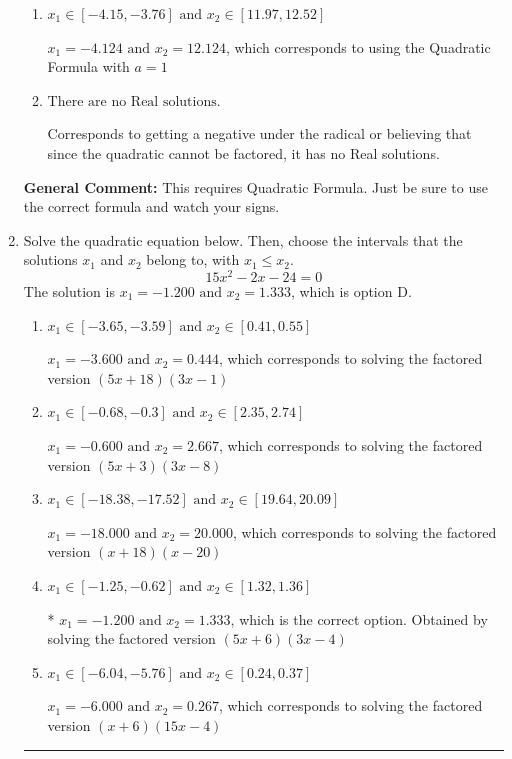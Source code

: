 \documentclass{extbook}[14pt]
\newcommand{\litem}[1]{\item #1

\rule{\textwidth}{0.4pt}}
\begin{document}
\begin{enumerate}
{\begin{enumerate}[label=\Alph*.]
 $x_1 = -15.848 \text{ and } x_2 = 16.648$, which corresponds to writing the Quadratic Formula as $-\frac{b}{2a} \pm \sqrt{b^2 - 4ac}$.
\item \( x_1 \in [-4.15, -3.76] \text{ and } x_2 \in [11.97, 12.52] \)

 $x_1 = -4.124 \text{ and } x_2 = 12.124$, which corresponds to using the Quadratic Formula with $a=1$
\item \( \text{There are no Real solutions.} \)

Corresponds to getting a negative under the radical or believing that since the quadratic cannot be factored, it has no Real solutions.
\end{enumerate}

\textbf{General Comment:} This requires Quadratic Formula. Just be sure to use the correct formula and watch your signs.
}
\litem{
Solve the quadratic equation below. Then, choose the intervals that the solutions $x_1$ and $x_2$ belong to, with $x_1 \leq x_2$.
\[ 15x^{2} -2 x -24 = 0 \]The solution is \( x_1 = -1.200 \text{ and } x_2 = 1.333 \), which is option D.\begin{enumerate}[label=\Alph*.]
\item \( x_1 \in [-3.65, -3.59] \text{ and } x_2 \in [0.41, 0.55] \)

$x_1 = -3.600 \text{ and } x_2 = 0.444$, which corresponds to solving the factored version $(5x + 18)(3x -1)$
\item \( x_1 \in [-0.68, -0.3] \text{ and } x_2 \in [2.35, 2.74] \)

$x_1 = -0.600 \text{ and } x_2 = 2.667$, which corresponds to solving the factored version $(5x + 3)(3x -8)$
\item \( x_1 \in [-18.38, -17.52] \text{ and } x_2 \in [19.64, 20.09] \)

$x_1 = -18.000 \text{ and } x_2 = 20.000$, which corresponds to solving the factored version $(x + 18)(x -20)$
\item \( x_1 \in [-1.25, -0.62] \text{ and } x_2 \in [1.32, 1.36] \)

* $x_1 = -1.200 \text{ and } x_2 = 1.333$, which is the correct option. Obtained by solving the factored version $(5x + 6)(3x -4)$
\item \( x_1 \in [-6.04, -5.76] \text{ and } x_2 \in [0.24, 0.37] \)

$x_1 = -6.000 \text{ and } x_2 = 0.267$, which corresponds to solving the factored version $(x + 6)(15x -4)$
\end{enumerate}

}
\end{enumerate}
\end{document}
